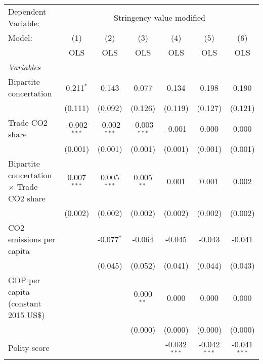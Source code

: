 
\begingroup
\centering
\begin{tabular}{lcccccc}
   \toprule
   Dependent Variable: & \multicolumn{6}{c}{Stringency value modified}\\
   Model:                                           & (1)            & (2)            & (3)            & (4)            & (5)            & (6)\\  
                                                    &  OLS           & OLS            & OLS            & OLS            & OLS            & OLS\\  
   \midrule
   \emph{Variables}\\
   Bipartite concertation                           & 0.211$^{*}$    & 0.143          & 0.077          & 0.134          & 0.198          & 0.190\\   
                                                    & (0.111)        & (0.092)        & (0.126)        & (0.119)        & (0.127)        & (0.121)\\   
   Trade CO2 share                                  & -0.002$^{***}$ & -0.002$^{***}$ & -0.003$^{***}$ & -0.001         & 0.000          & 0.000\\   
                                                    & (0.001)        & (0.001)        & (0.001)        & (0.001)        & (0.001)        & (0.001)\\   
   Bipartite concertation $\times$ Trade CO2 share  & 0.007$^{***}$  & 0.005$^{***}$  & 0.005$^{**}$   & 0.001          & 0.001          & 0.002\\   
                                                    & (0.002)        & (0.002)        & (0.002)        & (0.002)        & (0.002)        & (0.002)\\   
   CO2 emissions per capita                         &                & -0.077$^{*}$   & -0.064         & -0.045         & -0.043         & -0.041\\   
                                                    &                & (0.045)        & (0.052)        & (0.041)        & (0.044)        & (0.043)\\   
   GDP per capita (constant 2015 US\$)              &                &                & 0.000$^{**}$   & 0.000          & 0.000          & 0.000\\   
                                                    &                &                & (0.000)        & (0.000)        & (0.000)        & (0.000)\\   
   Polity score                                     &                &                &                & -0.032$^{***}$ & -0.042$^{***}$ & -0.041$^{***}$\\   

\end{tabular}
